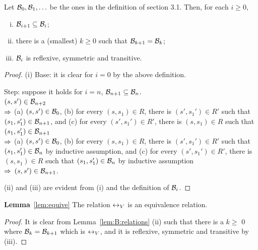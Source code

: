 \documentclass{article}
\begin{document}
\begin{lemma}\label{lem:B:relations}
  Let  ${\cal B}_0, {\cal B}_1,\ldots$ be the ones in the definition of section 3.1.
   Then,  for each $i\ge 0$,
   \begin{enumerate}[(i)]
     \item ${\cal B}_{i+1}\subseteq {\cal B}_i$;
     \item there is a (smallest) $k\ge 0$ such that ${\cal B}_{k+1}={\cal B}_k$;
     \item ${\cal B}_i$ is reflexive, symmetric and transitive.
   \end{enumerate}
\end{lemma}
\begin{proof}
  (i)
  Base: it is clear for $i=0$ by the above definition.

  Step: suppose it holds for $i=n$, \ie ${\cal B}_{n+1}\subseteq{\cal B}_n$. \\
  $(s,s')\in{\cal B}_{n+2}$\\
  $\Rightarrow$ (a) $(s,s')\in  {\cal B}_0$,
    (b) for every $(s,s_1)\in R$, there is $(s',s_1')\in R'$
     such that $(s_1,s_1')\in {\cal B}_{n+1}$, and
    (c)  for every $(s',s_1')\in R'$, there is $(s,s_1)\in R$
    such that $(s_1,s_1')\in {\cal B}_{n+1}$\\
  $\Rightarrow$ (a) $(s,s')\in  {\cal B}_0$,
   (b) for every $(s,s_1)\in R$, there is $(s',s_1')\in R'$
     such that $(s_1,s_1')\in {\cal B}_{n}$ by inductive assumption, and
   (c)  for every $(s',s_1')\in R'$, there is $(s,s_1)\in R$
    such that $(s_1,s_1')\in {\cal B}_{n}$ by inductive assumption\\
  $\Rightarrow$ $(s,s')\in {\cal B}_{n+1}$.

  (ii) and (iii) are evident from (i) and the definition of ${\cal B}_i$.
\end{proof}


\textbf{Lemma}~\ref{lem:equive}  The relation $\leftrightarrow_V$ is an equivalence relation.\\
\begin{proof}
It is clear from Lemma~\ref{lem:B:relations} (ii) such that there is a $k \geq $ 0 where ${\cal B}_k = {\cal B}_{k+1}$ which is  $\leftrightarrow_V$, and it is reflexive, symmetric and transitive by (iii).
\end{proof}
\end{document}
